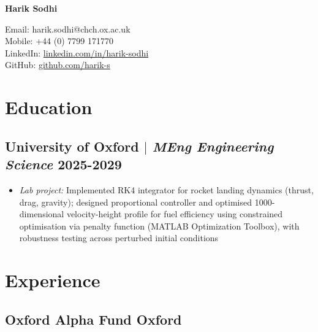 \documentclass[11pt]{article} %
\begin{document}
\begin{center}
	\begin{minipage}{0.45\textwidth}
		{\Huge\bfseries
			Harik Sodhi %
		} \\ \medskip
	\end{minipage} \hfill
	\begin{minipage}{0.5\textwidth}
		\raggedleft
		Email: harik.sodhi@chch.ox.ac.uk \\
		Mobile: +44 (0) 7799 171770 \\
		LinkedIn: \href{https://linkedin.com/in/harik-sodhi}{linkedin.com/in/harik-sodhi}\\
		GitHub: \href{https://github.com/harik-s}{github.com/harik-s}\\
	\end{minipage}
\end{center}

\section{Education}
\subsection{University of Oxford $|$ {\normalfont\itshape MEng Engineering Science} \hfill 2025-2029}
\begin{itemize}
	\item \textit{Lab project:} Implemented RK4 integrator for rocket landing dynamics 
(thrust, drag, gravity); designed proportional controller and optimised 1000-dimensional 
velocity-height profile for fuel efficiency using constrained optimisation via penalty 
function (MATLAB Optimization Toolbox), with robustness testing across perturbed 
initial conditions
\end{itemize}

\section{Experience}
\subsection{Oxford Alpha Fund \hfill Oxford}
\end{document}

